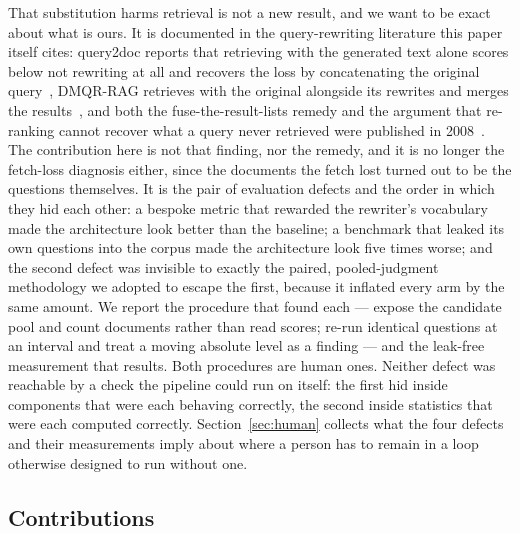 \documentclass[acmsmall,review,anonymous,screen]{acmart}
\begin{document}
That substitution harms retrieval is not a new result, and we want to be exact
about what is ours. It is documented in the query-rewriting literature this
paper itself cites: query2doc reports that retrieving with the generated text
alone scores below not rewriting at all and recovers the loss by concatenating
the original query~\cite{wang2023query2doc}, DMQR-RAG retrieves with the original
alongside its rewrites and merges the results~\cite{gao2024dmqr}, and both the
fuse-the-result-lists remedy and the argument that re-ranking cannot recover what
a query never retrieved were published in 2008~\cite{zighelnic2008drift}. The
contribution here is not that finding, nor the remedy, and it is no longer the
fetch-loss diagnosis either, since the documents the fetch lost turned out to be
the questions themselves. It is the pair of evaluation defects and the order in
which they hid each other: a bespoke metric that rewarded the rewriter's
vocabulary made the architecture look better than the baseline; a benchmark
that leaked its own questions into the corpus made the architecture look five
times worse; and the second defect was invisible to exactly the paired,
pooled-judgment methodology we adopted to escape the first, because it inflated
every arm by the same amount. We report the procedure that found each --- expose
the candidate pool and count documents rather than read scores; re-run identical
questions at an interval and treat a moving absolute level as a finding --- and
the leak-free measurement that results. Both procedures are human ones. Neither
defect was reachable by a check the pipeline could run on itself: the first hid
inside components that were each behaving correctly, the second inside
statistics that were each computed correctly. Section~\ref{sec:human} collects
what the four defects and their measurements imply about where a person has to
remain in a loop otherwise designed to run without one.

\subsection{Contributions}
\end{document}
